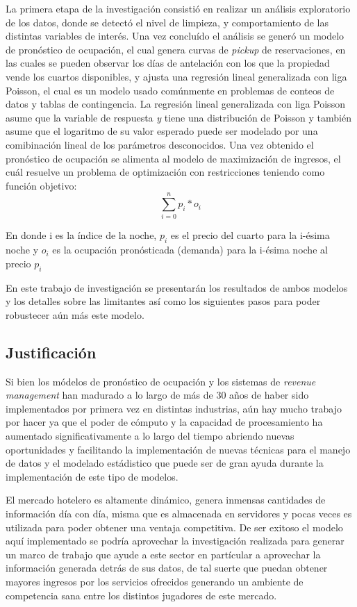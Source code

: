 La primera etapa de la investigación consistió en realizar un análisis exploratorio de los datos, donde se detectó el nivel de limpieza, y comportamiento de las distintas variables de interés. Una vez concluído el análisis se generó un modelo de pronóstico de ocupación, el cual genera curvas de \emph{pickup} de reservaciones, en las cuales se pueden observar los días de antelación con los que la propiedad vende los cuartos disponibles, y ajusta una regresión lineal generalizada con liga Poisson, el cual es un modelo usado comúnmente en problemas de conteos de datos y tablas de contingencia. La regresión lineal generalizada con liga Poisson asume que la variable de respuesta \emph{y} tiene una distribución de Poisson y también asume que el logaritmo de su valor esperado puede ser modelado por una comibinación lineal de los parámetros desconocidos. Una vez obtenido el pronóstico de ocupación se alimenta al modelo de maximización de ingresos, el cuál resuelve un problema de optimización con restricciones teniendo como función objetivo:$$\sum_{i=0}^{n}p_i*o_i$$

En donde i es la índice de la noche, $p_i$ es el precio del cuarto para la i-ésima noche y $o_i$ es la ocupación pronósticada (demanda) para la i-ésima noche al precio $p_i$

En este trabajo de investigación se presentarán los resultados de ambos modelos y los detalles sobre las limitantes así como los siguientes pasos para poder robustecer aún más este modelo.

\subsection*{Justificación}

Si bien los módelos de pronóstico de ocupación y los sistemas de \emph{revenue management} han madurado a lo largo de más de 30 años de haber sido implementados por primera vez en distintas industrias, aún hay mucho trabajo por hacer ya que el poder de cómputo y la capacidad de procesamiento ha aumentado significativamente a lo largo del tiempo abriendo nuevas oportunidades y facilitando la implementación de nuevas técnicas para el manejo de datos y el modelado estádistico que puede ser de gran ayuda durante la implementación de este tipo de modelos.

El mercado hotelero es altamente dinámico, genera inmensas cantidades de información día con día, misma que es almacenada en servidores y pocas veces es utilizada para poder obtener una ventaja competitiva. De ser exitoso el modelo aquí implementado se podría aprovechar la investigación realizada para generar un marco de trabajo que ayude a este sector en partícular a aprovechar la información generada detrás de sus datos, de tal suerte que puedan obtener mayores ingresos por los servicios ofrecidos generando un ambiente de competencia sana entre los distintos jugadores de este mercado.



